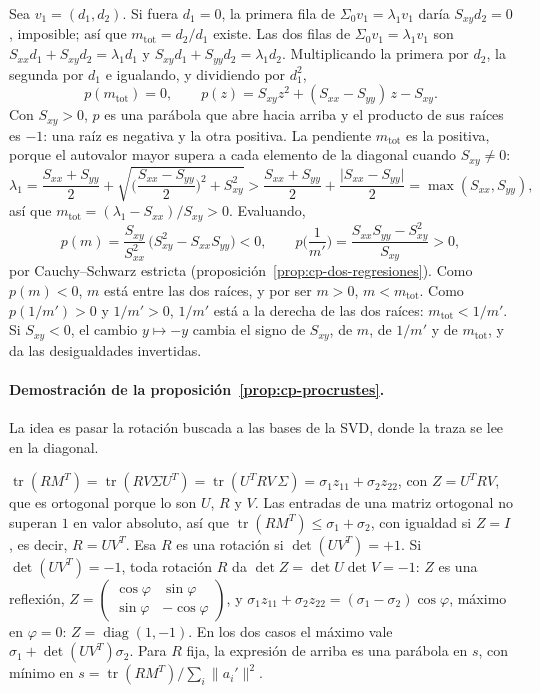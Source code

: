 \begin{demostracion}
Sea \(v_1=(d_1,d_2)\). Si fuera \(d_1=0\), la primera fila de \(\Sigma_0v_1=\lambda_1v_1\) daría
\(S_{xy}d_2=0\), imposible; así que \(m_{\mathrm{tot}}=d_2/d_1\) existe. Las dos filas de
\(\Sigma_0v_1=\lambda_1v_1\) son \(S_{xx}d_1+S_{xy}d_2=\lambda_1d_1\) y
\(S_{xy}d_1+S_{yy}d_2=\lambda_1d_2\). Multiplicando la primera por \(d_2\), la segunda por
\(d_1\) e igualando, y dividiendo por \(d_1^2\),
\[
  p(m_{\mathrm{tot}})=0,\qquad p(z)=S_{xy}z^2+(S_{xx}-S_{yy})\,z-S_{xy} .
\]
Con \(S_{xy}>0\), \(p\) es una parábola que abre hacia arriba y el producto de sus raíces es
\(-1\): una raíz es negativa y la otra positiva. La pendiente \(m_{\mathrm{tot}}\) es la positiva, porque el
autovalor mayor supera a cada elemento de la diagonal cuando \(S_{xy}\neq0\):
\[
  \lambda_1=\frac{S_{xx}+S_{yy}}2+\sqrt{\Big(\frac{S_{xx}-S_{yy}}2\Big)^2+S_{xy}^2}
  >\frac{S_{xx}+S_{yy}}2+\frac{\lvert S_{xx}-S_{yy}\rvert}2=\max(S_{xx},S_{yy}),
\]
así que \(m_{\mathrm{tot}}=(\lambda_1-S_{xx})/S_{xy}>0\). Evaluando,
\[
  p(m)=\frac{S_{xy}}{S_{xx}^2}\,\big(S_{xy}^2-S_{xx}S_{yy}\big)<0,\qquad
  p\Big(\frac1{m'}\Big)=\frac{S_{xx}S_{yy}-S_{xy}^2}{S_{xy}}>0,
\]
por Cauchy--Schwarz estricta (proposición~\ref{prop:cp-dos-regresiones}). Como \(p(m)<0\),
\(m\) está entre las dos raíces, y por ser \(m>0\), \(m<m_{\mathrm{tot}}\). Como \(p(1/m')>0\) y
\(1/m'>0\), \(1/m'\) está a la derecha de las dos raíces: \(m_{\mathrm{tot}}<1/m'\). Si \(S_{xy}<0\), el
cambio \(y\mapsto-y\) cambia el signo de \(S_{xy}\), de \(m\), de \(1/m'\) y de \(m_{\mathrm{tot}}\), y da
las desigualdades invertidas.
\end{demostracion}

\paragraph{Demostración de la proposición~\ref{prop:cp-procrustes}.} La idea es pasar la
rotación buscada a las bases de la SVD, donde la traza se lee en la diagonal.

\begin{demostracion}
\(\operatorname{tr}(RM^T)=\operatorname{tr}(RV\Sigma U^T)=\operatorname{tr}(U^TRV\,\Sigma)
=\sigma_1z_{11}+\sigma_2z_{22}\), con \(Z=U^TRV\), que es ortogonal porque lo son \(U\), \(R\)
y \(V\). Las entradas de una matriz ortogonal no superan \(1\) en valor absoluto, así que
\(\operatorname{tr}(RM^T)\le\sigma_1+\sigma_2\), con igualdad si \(Z=I\), es decir,
\(R=UV^T\). Esa \(R\) es una rotación si \(\det(UV^T)=+1\). Si \(\det(UV^T)=-1\), toda
rotación \(R\) da \(\det Z=\det U\det V=-1\): \(Z\) es una reflexión,
\(Z=\left(\begin{smallmatrix}\cos\varphi&\sin\varphi\\\sin\varphi&-\cos\varphi\end{smallmatrix}\right)\),
y \(\sigma_1z_{11}+\sigma_2z_{22}=(\sigma_1-\sigma_2)\cos\varphi\), máximo en \(\varphi=0\):
\(Z=\operatorname{diag}(1,-1)\). En los dos casos el máximo vale
\(\sigma_1+\det(UV^T)\sigma_2\). Para \(R\) fija, la expresión de arriba es una parábola en
\(s\), con mínimo en \(s=\operatorname{tr}(RM^T)/\sum_i\lVert a_i'\rVert^2\).
\end{demostracion}

